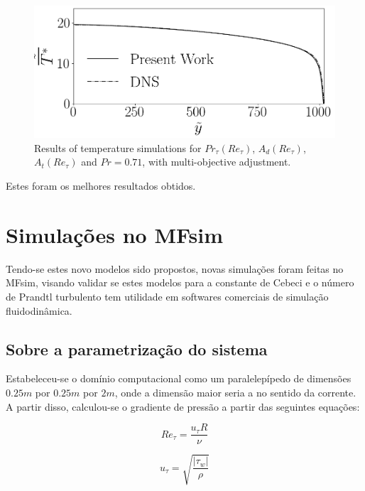 \begin{figure}[!h]
\begin{minipage}[t]{0.5\textwidth}
	\end{minipage}
	\begin{minipage}[t]{0.45\textwidth}
		\centering
		\includegraphics[angle=0, scale=0.24]{fotos_formatacao_final/Temperature_1000_071_Genetic2temperature}
	\end{minipage}	
	\caption{Results of temperature simulations for $Pr_\tau(Re_\tau)$, $A_d(Re_\tau)$, $A_t(Re_\tau) $ and $Pr =0.71$, with multi-objective adjustment.}
\end{figure}

Estes foram os melhores resultados obtidos.


\chapter{Simulações no MFsim}

Tendo-se estes novo modelos sido propostos, novas simulações foram feitas no MFsim, visando validar se estes modelos para a constante de Cebeci e o número de Prandtl turbulento tem utilidade em softwares comerciais de simulação fluidodinâmica.

\section{Sobre a parametrização do sistema}
Estabeleceu-se o domínio computacional como um paralelepípedo de dimensões $0.25m$ por $0.25m$ por $2m$, onde a dimensão maior seria a no sentido da corrente. A partir disso, calculou-se o gradiente de pressão a partir das seguintes equações:

\begin{equation}
  Re_\tau = \frac{u_\tau R}{\nu}
\end{equation}

\begin{equation}
  u_\tau = \sqrt{\frac{|\tau_w|}{\rho}}
\end{equation}

